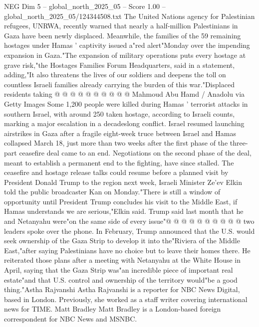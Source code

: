 \begin{textsample}{NEG Dim 5 – global\_north\_2025\_05 – Score 1.00 – global\_north\_2025\_05/124344508.txt}
The United Nations agency for Palestinian refugees, UNRWA, recently warned that nearly a half-million Palestinians in Gaza have been newly displaced.
Meanwhile, the families of the 59 remaining hostages under Hamas ' captivity issued a"red alert"Monday over the impending expansion in Gaza."The expansion of military operations puts every hostage at grave risk,"the Hostages Families Forum Headquarters, said in a statement, adding,"It also threatens the lives of our soldiers and deepens the toll on countless Israeli families already carrying the burden of this war."Displaced residents taking @ @ @ @ @ @ @ @ @ @ Mahmoud Abu Hamd / Anadolu via Getty Images Some 1,200 people were killed during Hamas ' terrorist attacks in southern Israel, with around 250 taken hostage, according to Israeli counts, marking a major escalation in a decadeslong conflict.
Israel resumed launching airstrikes in Gaza after a fragile eight-week truce between Israel and Hamas collapsed March 18, just more than two weeks after the first phase of the three-part ceasefire deal came to an end.
Negotiations on the second phase of the deal, meant to establish a permanent end to the fighting, have since stalled.
The ceasefire and hostage release talks could resume before a planned visit by President Donald Trump to the region next week, Israeli Minister Ze'ev Elkin told the public broadcaster Kan on Monday."There is still a window of opportunity until President Trump concludes his visit to the Middle East, if Hamas understands we are serious,"Elkin said.
Trump said last month that he and Netanyahu were"on the same side of every issue"@ @ @ @ @ @ @ @ @ @ two leaders spoke over the phone.
In February, Trump announced that the U.S. would seek ownership of the Gaza Strip to develop it into the"Riviera of the Middle East,"after saying Palestinians have no choice but to leave their homes there.
He reiterated those plans after a meeting with Netanyahu at the White House in April, saying that the Gaza Strip was"an incredible piece of important real estate"and that U.S. control and ownership of the territory would"be a good thing."Astha Rajvanshi Astha Rajvanshi is a reporter for NBC News Digital, based in London.
Previously, she worked as a staff writer covering international news for TIME.
Matt Bradley Matt Bradley is a London-based foreign correspondent for NBC News and MSNBC.

\end{textsample}
